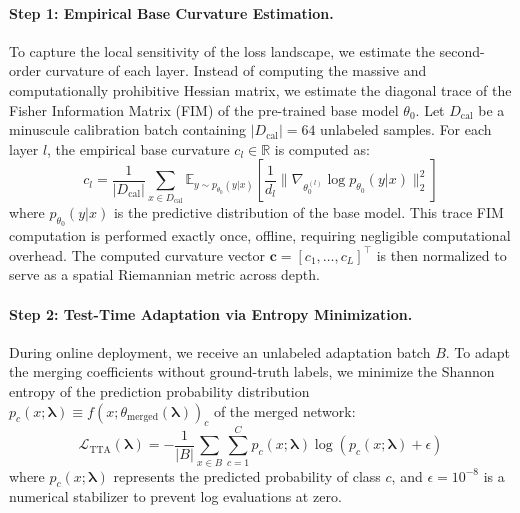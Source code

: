 \paragraph{Step 1: Empirical Base Curvature Estimation.} 
To capture the local sensitivity of the loss landscape, we estimate the second-order curvature of each layer. Instead of computing the massive and computationally prohibitive Hessian matrix, we estimate the diagonal trace of the Fisher Information Matrix (FIM) of the pre-trained base model $\theta_0$. Let $D_{\text{cal}}$ be a minuscule calibration batch containing $|D_{\text{cal}}| = 64$ unlabeled samples. For each layer $l$, the empirical base curvature $c_l \in \mathbb{R}$ is computed as:
\begin{equation}
\label{eq:curvature_estimation}
c_l = \frac{1}{|D_{\text{cal}}|} \sum_{x \in D_{\text{cal}}} \mathbb{E}_{y \sim p_{\theta_0}(y|x)} \left[ \frac{1}{d_l} \|\nabla_{\theta_0^{(l)}} \log p_{\theta_0}(y|x)\|_2^2 \right]
\end{equation}
where $p_{\theta_0}(y|x)$ is the predictive distribution of the base model. This trace FIM computation is performed exactly once, offline, requiring negligible computational overhead. The computed curvature vector $\mathbf{c} = [c_1, \dots, c_L]^\top$ is then normalized to serve as a spatial Riemannian metric across depth.

\paragraph{Step 2: Test-Time Adaptation via Entropy Minimization.}
During online deployment, we receive an unlabeled adaptation batch $B$. To adapt the merging coefficients without ground-truth labels, we minimize the Shannon entropy of the prediction probability distribution $p_c(x; \boldsymbol{\lambda}) \equiv f(x; \theta_{\text{merged}}(\boldsymbol{\lambda}))_c$ of the merged network:
\begin{equation}
\label{eq:tta_loss}
\mathcal{L}_{\text{TTA}}(\boldsymbol{\lambda}) = -\frac{1}{|B|} \sum_{x \in B} \sum_{c=1}^C p_c(x; \boldsymbol{\lambda}) \log \left( p_c(x; \boldsymbol{\lambda}) + \epsilon \right)
\end{equation}
where $p_c(x; \boldsymbol{\lambda})$ represents the predicted probability of class $c$, and $\epsilon = 10^{-8}$ is a numerical stabilizer to prevent log evaluations at zero.

